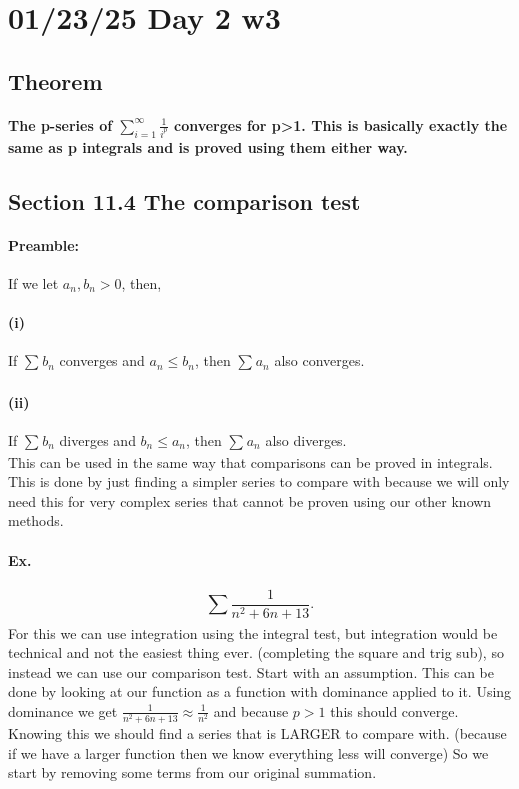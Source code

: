 \section{01/23/25 Day 2 w3}%
\label{sec:01/23/25 Final notes on 11.3}

\subsection*{Theorem}%
\label{sub:Theorem}
\paragraph{The p-series of $ \sum_{ i=1 } ^{ \infty } \frac{ 1 }{ i^{ p } }  $ converges for p>1. This is basically exactly the same as p integrals and is proved using them either way.}

\subsection{Section 11.4 The comparison test}%
\label{sub:Section 11.4 The comparison test}
\paragraph{Preamble:}
If we let $ a_n,b_n >0 $, then,
\paragraph{(i)} If $ \sum_{  } ^{  } b_n $ converges and $ a_n \le b_n $, then $ \sum_{  } ^{  } a_n $ also converges. 
\paragraph{(ii)} If $ \sum_{  } ^{ } b_n $ diverges and $ b_n \le a_n $, then $ \sum_{  } ^{  } a_n $ also diverges. \\
This can be used in the same way that comparisons can be proved in integrals. This is done by just finding a simpler series to compare with because we will only need this for very complex series that cannot be proven using our other known methods. 

\paragraph{Ex.}
\[
\sum_{  } ^{  } \frac{ 1 }{ n^2+6n+13 } 
.\] 
For this we can use integration using the integral test, but integration would be technical and not the easiest thing ever. (completing the square and trig sub), so instead we can use our comparison test. Start with an assumption. This can be done by looking at our function as a function with dominance applied to it. Using dominance we get $ \frac{ 1 }{ n^2+6n+13 } \approx \frac{ 1 }{ n^2 }  $ and because $ p>1 $ this should converge. Knowing this we should find a series that is LARGER to compare with. (because if we have a larger function then we know everything less will converge) So we start by removing some terms from our original summation. \\

